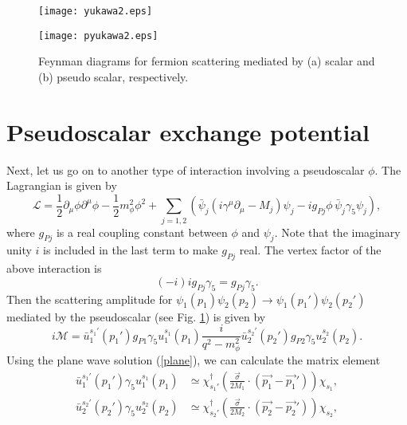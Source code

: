 \documentclass[12pt, a4paper]{article}
\begin{document}
\begin{figure}
\begin{minipage}{0.5\hsize}
\centering
\texttt{[image: yukawa2.eps]}
\label{diagram1}
\end{minipage}
\begin{minipage}{0.5\hsize}
\centering
\texttt{[image: pyukawa2.eps]}
\label{diagram2}
\end{minipage}
\caption{Feynman diagrams for fermion scattering mediated by (a) scalar and (b) pseudo scalar, respectively.}
\end{figure}


\section{Pseudoscalar exchange potential}
Next, let us go on to another type of interaction involving a pseudoscalar $\phi$. The Lagrangian is given by
%
\begin{equation}
\mathcal{L}=\frac{1}{2}\partial_\mu\phi\partial^\mu\phi-\frac{1}{2}m_\phi^2\phi^2
+\sum_{j=1,2} \left(
\bar{\psi}_j(i\gamma^\mu\partial_\mu-M_j)\psi_j-  i g_{Pj}\phi \,\bar{\psi}_j\gamma_5\psi_j
\right)
\label{pyukawa},%
\end{equation} 
%
where $g_{Pj}$ is a real coupling constant between $\phi$ and $\psi_j$. Note that the imaginary unity $i$ is 
included in the last term to make $g_{Pj}$ real.  
The vertex factor of the above interaction is
\begin{equation}
(-i)ig_{Pj}\gamma_{5} = g_{Pj}\gamma_{5}.
\end{equation}
Then the scattering amplitude for $\psi_1(p_1)\psi_2(p_2)\to\psi_1(p_1')\psi_2(p_2')$ mediated by the pseudoscalar (see Fig. \ref{diagram2}) is given by
%
\begin{equation}
i\mathcal{M}=\bar{u}_1^{s_1'}(p_1')g_{P1}\gamma_5u_1^{s_1}(p_1)\frac{i}{q^2-m_\phi^2}\bar{u}_2^{s_2'}(p_2')g_{P2}\gamma_5u_2^{s_2}(p_2).\label{amp2}%
\end{equation}
Using the plane wave solution (\ref{plane}), we can calculate the matrix element
%
\begin{align}
\bar{u}_1^{s_1'}(p_1')\gamma_5u_1^{s_1}(p_1) & \simeq \chi_{s_1'}^{\dag}\left(\frac{\vec{\sigma}}{2M_1}\cdot(\vec{p_1}-\vec{p_1}')\right)\chi_{s_1},\\
\bar{u}_2^{s_2'}(p_2')\gamma_5u_2^{s_2}(p_2) & \simeq \chi_{s_2'}^{\dag}\left(\frac{\vec{\sigma}}{2M_2}\cdot(\vec{p_2}-\vec{p_2}')\right)\chi_{s_2},
\end{align}
\end{document}

